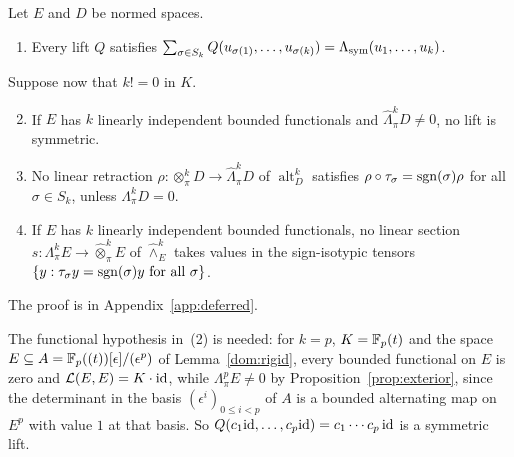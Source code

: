 \begin{proposition}\label{can:prop:asymmetry}
Let $E$ and $D$ be normed spaces.
\begin{enumerate}
\item Every lift $Q$ satisfies $\sum_{\sigma\in S_k}Q(u_{\sigma(1)},\dots,u_{\sigma(k)})=\Lambda_{\mathrm{sym}}(u_1,\dots,u_k)$.
\end{enumerate}
Suppose now that $k!=0$ in $K$.
\begin{enumerate}\setcounter{enumi}{1}
\item If $E$ has $k$ linearly independent bounded functionals and $\widehat\Lambda^k_\pi D\ne0$, no lift is symmetric.
\item No linear retraction $\rho\colon\otimes^k_\pi D\to\widehat\Lambda^k_\pi D$ of $\operatorname{alt}^k_D$ satisfies
$\rho\circ\tau_\sigma=\operatorname{sgn}(\sigma)\rho$ for all $\sigma\in S_k$, unless $\Lambda^k_\pi D=0$.
\item If $E$ has $k$ linearly independent bounded functionals, no linear section
$s\colon\Lambda^k_\pi E\to\widehat\otimes^k_\pi E$ of $\widehat\wedge^k_E$ takes values in the sign-isotypic tensors
$\{y:\tau_\sigma y=\operatorname{sgn}(\sigma)y\text{ for all }\sigma\}$.
\end{enumerate}
\end{proposition}

The proof is in Appendix~\ref{app:deferred}.

The functional hypothesis in~(2) is needed: for $k=p$, $K=\mathbb F_p(t)$ and the space
$E\subseteq A=\mathbb F_p((t))[\epsilon]/(\epsilon^p)$ of Lemma~\ref{dom:rigid}, every bounded functional on $E$ is zero and
$\mathcal L(E,E)=K\cdot\mathrm{id}$, while $\Lambda^p_\pi E\ne0$ by Proposition~\ref{prop:exterior}, since the determinant in the basis
$(\epsilon^i)_{0\le i<p}$ of $A$ is a bounded alternating map on $E^p$ with value $1$ at that basis. So
$Q(c_1\mathrm{id},\dots,c_p\mathrm{id})=c_1\cdots c_p\,\mathrm{id}$ is a symmetric lift.
